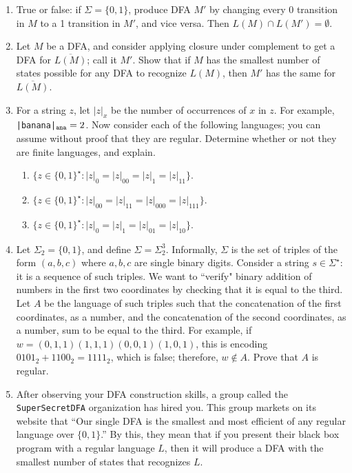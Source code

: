 \begin{enumerate}
\item {} True or false: if $\Sigma=\{0,1\}$, produce DFA $M'$ by changing every 0 transition in $M$ to a 1 transition in $M'$, and vice versa. Then $L(M) \cap L(M') = \emptyset$.

\item {} Let $M$ be a DFA, and consider applying closure under complement to get a DFA for $\overline{L(M)}$; call it $M'$. 
Show that if $M$ has the smallest number of states possible for any DFA to recognize $L(M)$, then $M'$ has the same for $\overline{L(M)}$.

\item {} For a string $z$, let $|z|_x$ be the number of occurrences of $x$ in $z$.
For example, {\tt |banana|}$_{\tt ana} = 2$. 
Now consider each of the following languages; you can assume without proof that they are regular.
Determine whether or not they are finite languages, and explain.
\begin{enumerate}
	\item $\{z \in \{0,1\}^\star : |z|_0 = |z|_{00} = |z|_{1} = |z|_{11}\}$.
	\item $\{z \in \{0,1\}^\star : |z|_{00} = |z|_{11} = |z|_{000} = |z|_{111}\}$.
	\item $\{z \in \{0,1\}^\star : |z|_0 = |z|_{1} = |z|_{01} = |z|_{10}\}$.
\end{enumerate}

\item {} Let $\Sigma_{2} = \{0, 1\}$, and define $\Sigma = \Sigma_{2}^3$. Informally, $\Sigma$ is the set of triples of the form $(a, b, c)$ where $a, b, c$ are single binary digits. Consider a string $s \in \Sigma^\star$: it is a sequence of such triples. We want to ``verify" binary addition of numbers in the first two coordinates by checking that it is equal to the third. Let $A$ be the language of such triples such that the concatenation of the first coordinates, as a number, and the concatenation of the second coordinates, as a number, sum to be equal to the third. For example, if $w = (0, 1, 1)(1,1,1)(0,0,1)(1,0,1)$, this is encoding $0101_2 + 1100_2 = 1111_2$, which is false; therefore, $w \notin A$. Prove that $A$ is regular.

\item {} After observing your DFA construction skills, a group called the {\tt SuperSecretDFA} organization has hired you. This group markets on its website that ``Our single DFA is the smallest and most efficient of any regular language over $\{0,1\}$.''
By this, they mean that if you present their black box program with a regular language $L$, then it will produce a DFA with the smallest number of states that recognizes $L$.


\end{enumerate}
